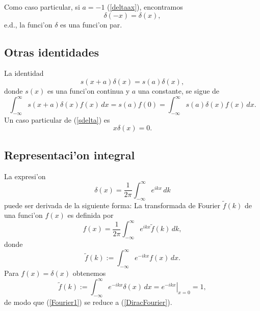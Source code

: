 Como caso particular, si $a=-1$ (\ref{deltaax}), encontramos
\begin{equation}
\boxed{\delta(-x) = \delta(x),}
\end{equation}
e.d., la funci'on $\delta$ es una funci'on par.

\subsection{Otras identidades}
La identidad
\begin{equation}
\boxed{s(x + a) \delta(x) = s(a) \delta(x),}\label{sdelta}
\end{equation}
donde $s(x)$ es una funci'on continua y $a$ una constante, se sigue de
\begin{equation}
\int_{- \infty}^{\infty} s(x + a) \delta(x) f(x)\,dx = s(a) f(0) =
\int_{- \infty}^{\infty} s(a) \delta(x) f(x)\,dx .
\end{equation}
Un caso particular de (\ref{sdelta}) es
\begin{equation}
\boxed{x \delta(x) = 0 .}
\end{equation}

\subsection{Representaci'on integral}\label{sec:DiracFourier}
La expresi'on
\begin{equation}
\boxed{\delta(x) = \frac{1}{2 \pi} \int_{-\infty}^{\infty} e^{i k x}\,d k}
\label{DiracFourier}
\end{equation}
puede ser derivada de la siguiente forma: La transformada de Fourier
$\tilde{f}(k)$ de una funci'on $f(x)$ es definida por
\begin{equation}
f(x) = \frac{1}{2 \pi} \int_{- \infty}^{\infty} e^{i k x } \tilde{f}(k)\,dk ,
\label{Fourier1}
\end{equation}
donde
\begin{equation}
 \tilde{f}(k) := \int_{- \infty}^{\infty} e^{- i k x } f(x)\,dx.
\end{equation}
Para $f(x)=\delta(x)$ obtenemos
\begin{equation}
 \tilde{f}(k) := \int_{- \infty}^{\infty} e^{- i k x } \delta(x)\,dx=\left.e^{-
i k x}\right|_{x=0}=1,
\end{equation}
de modo que (\ref{Fourier1}) se reduce a (\ref{DiracFourier}).

